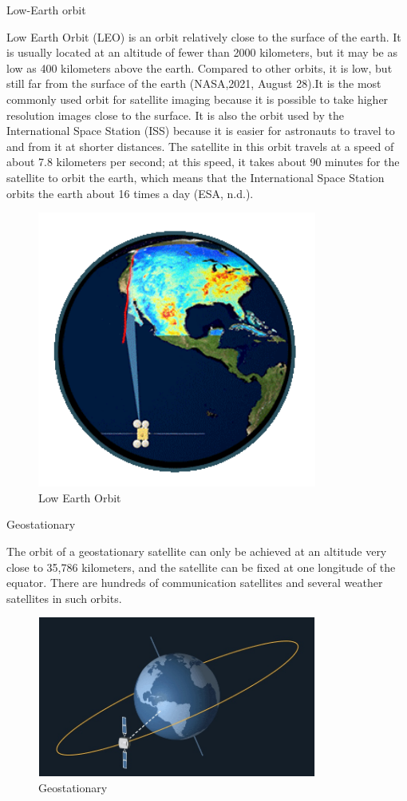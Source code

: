 \documentclass[conference]{IEEEtran}
\newcommand{\subparagraph}{}
\begin{document}
\subparagraph{Low-Earth orbit}

Low Earth Orbit (LEO) is an orbit relatively close to the surface of the earth. It is usually located at an altitude of fewer than 
2000 kilometers, but it may be as low as 400 kilometers above the earth. Compared to other orbits, it is low, but still far from the 
surface of the earth (NASA,2021, August 28).It is the most commonly used orbit for satellite imaging because it is possible to take 
higher resolution images close to the surface. It is also the orbit used by the International Space Station (ISS) because it is easier 
for astronauts to travel to and from it at shorter distances. The satellite in this orbit travels at a speed of about 7.8 kilometers per 
second; at this speed, it takes about 90 minutes for the satellite to orbit the earth, which means that the International Space Station 
orbits the earth about 16 times a day (ESA, n.d.).

\begin{figure}[htbp]
    \centerline{\includegraphics[width=260pt]{images/1.1.2.png}}
    \caption{Low Earth Orbit }
    \label{LEO}
\end{figure}

\subparagraph{Geostationary}

The orbit of a geostationary satellite can only be achieved at an altitude very close to 35,786 kilometers, and the satellite can 
be fixed at one longitude of the equator. There are hundreds of communication satellites and several weather satellites in such orbits.

\begin{figure}[htbp]
    \centerline{\includegraphics[width=260pt]{images/1.1.3.png}}
    \caption{Geostationary}
    \label{Geostationary}
\end{figure}
\end{document}
